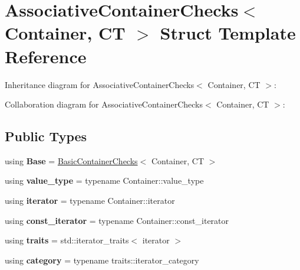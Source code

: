\hypertarget{struct_associative_container_checks}{}\section{Associative\+Container\+Checks$<$ Container, CT $>$ Struct Template Reference}
\label{struct_associative_container_checks}


Inheritance diagram for Associative\+Container\+Checks$<$ Container, CT $>$\+:


Collaboration diagram for Associative\+Container\+Checks$<$ Container, CT $>$\+:
\subsection*{Public Types}
\begin{DoxyCompactItemize}
\item 
\mbox{\label{struct_associative_container_checks_a61b560341bb54defb9e9bb77ca2677ff}} 
using {\bfseries Base} = \mbox{\hyperlink{struct_iterator_debug_checks_1_1_basic_container_checks}{Basic\+Container\+Checks}}$<$ Container, CT $>$
\item 
\mbox{\label{struct_associative_container_checks_a78e48b85897c275a0f8be5e53684f05b}} 
using {\bfseries value\+\_\+type} = typename Container\+::value\+\_\+type
\item 
\mbox{\label{struct_associative_container_checks_a13a19fb7a4ecd89ae5a5c1d7f173ebc9}} 
using {\bfseries iterator} = typename Container\+::iterator
\item 
\mbox{\label{struct_associative_container_checks_aabb4851be0406a04937d21fd89964e38}} 
using {\bfseries const\+\_\+iterator} = typename Container\+::const\+\_\+iterator
\item 
\mbox{\label{struct_associative_container_checks_ad6712f6cf1718621c5406383f7b835d2}} 
using {\bfseries traits} = std\+::iterator\+\_\+traits$<$ iterator $>$
\item 
\mbox{\label{struct_associative_container_checks_a78fbbb7930e656308015ac599e680d3b}} 
using {\bfseries category} = typename traits\+::iterator\+\_\+category
\end{DoxyCompactItemize}
